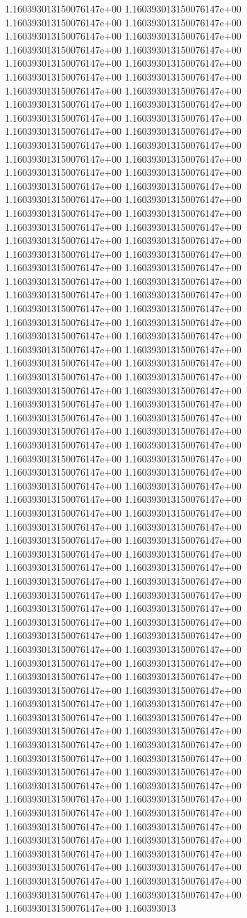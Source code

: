 1.160393013150076147e+00	1.160393013150076147e+00	1.160393013150076147e+00	1.160393013150076147e+00	1.160393013150076147e+00	1.160393013150076147e+00	1.160393013150076147e+00	1.160393013150076147e+00	1.160393013150076147e+00	1.160393013150076147e+00	1.160393013150076147e+00	1.160393013150076147e+00	1.160393013150076147e+00	1.160393013150076147e+00	1.160393013150076147e+00	1.160393013150076147e+00	1.160393013150076147e+00	1.160393013150076147e+00	1.160393013150076147e+00	1.160393013150076147e+00	1.160393013150076147e+00	1.160393013150076147e+00	1.160393013150076147e+00	1.160393013150076147e+00	1.160393013150076147e+00	1.160393013150076147e+00	1.160393013150076147e+00	1.160393013150076147e+00	1.160393013150076147e+00	1.160393013150076147e+00	1.160393013150076147e+00	1.160393013150076147e+00	1.160393013150076147e+00	1.160393013150076147e+00	1.160393013150076147e+00	1.160393013150076147e+00	1.160393013150076147e+00	1.160393013150076147e+00	1.160393013150076147e+00	1.160393013150076147e+00	1.160393013150076147e+00	1.160393013150076147e+00	1.160393013150076147e+00	1.160393013150076147e+00	1.160393013150076147e+00	1.160393013150076147e+00	1.160393013150076147e+00	1.160393013150076147e+00	1.160393013150076147e+00	1.160393013150076147e+00	1.160393013150076147e+00	1.160393013150076147e+00	1.160393013150076147e+00	1.160393013150076147e+00	1.160393013150076147e+00	1.160393013150076147e+00	1.160393013150076147e+00	1.160393013150076147e+00	1.160393013150076147e+00	1.160393013150076147e+00	1.160393013150076147e+00	1.160393013150076147e+00	1.160393013150076147e+00	1.160393013150076147e+00	1.160393013150076147e+00	1.160393013150076147e+00	1.160393013150076147e+00	1.160393013150076147e+00	1.160393013150076147e+00	1.160393013150076147e+00	1.160393013150076147e+00	1.160393013150076147e+00	1.160393013150076147e+00	1.160393013150076147e+00	1.160393013150076147e+00	1.160393013150076147e+00	1.160393013150076147e+00	1.160393013150076147e+00	1.160393013150076147e+00	1.160393013150076147e+00	1.160393013150076147e+00	1.160393013150076147e+00	1.160393013150076147e+00	1.160393013150076147e+00	1.160393013150076147e+00	1.160393013150076147e+00	1.160393013150076147e+00	1.160393013150076147e+00	1.160393013150076147e+00	1.160393013150076147e+00	1.160393013150076147e+00	1.160393013150076147e+00	1.160393013150076147e+00	1.160393013150076147e+00	1.160393013150076147e+00	1.160393013150076147e+00	1.160393013150076147e+00	1.160393013150076147e+00	1.160393013150076147e+00	1.160393013150076147e+00	1.160393013150076147e+00	1.160393013150076147e+00	1.160393013150076147e+00	1.160393013150076147e+00	1.160393013150076147e+00	1.160393013150076147e+00	1.160393013150076147e+00	1.160393013150076147e+00	1.160393013150076147e+00	1.160393013150076147e+00	1.160393013150076147e+00	1.160393013150076147e+00	1.160393013150076147e+00	1.160393013150076147e+00	1.160393013150076147e+00	1.160393013150076147e+00	1.160393013150076147e+00	1.160393013150076147e+00	1.160393013150076147e+00	1.160393013150076147e+00	1.160393013150076147e+00	1.160393013150076147e+00	1.160393013150076147e+00	1.160393013150076147e+00	1.160393013150076147e+00	1.160393013150076147e+00	1.160393013150076147e+00	1.160393013150076147e+00	1.160393013150076147e+00	1.160393013150076147e+00	1.160393013150076147e+00	1.160393013150076147e+00	1.160393013150076147e+00	1.160393013